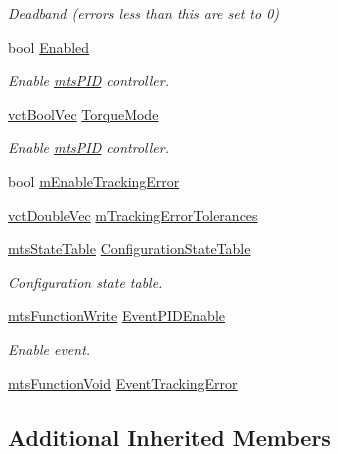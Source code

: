 \begin{DoxyCompactItemize}
\begin{DoxyCompactList}\small\item\em Deadband (errors less than this are set to 0) \end{DoxyCompactList}\item 
bool \hyperlink{classmts_p_i_d_afc7cfa0ce58391af303c8efc4430e427}{Enabled}
\begin{DoxyCompactList}\small\item\em Enable \hyperlink{classmts_p_i_d}{mts\+P\+I\+D} controller. \end{DoxyCompactList}\item 
\hyperlink{vct_dynamic_vector_types_8h_aeb2237c134aee3769198bd9d55c8a9e0}{vct\+Bool\+Vec} \hyperlink{classmts_p_i_d_a7bd7ccfcdc69d5d5b91087f019c01c63}{Torque\+Mode}
\begin{DoxyCompactList}\small\item\em Enable \hyperlink{classmts_p_i_d}{mts\+P\+I\+D} controller. \end{DoxyCompactList}\item 
bool \hyperlink{classmts_p_i_d_aa6fc2821554893e5dfe885094fde8017}{m\+Enable\+Tracking\+Error}
\item 
\hyperlink{vct_dynamic_vector_types_8h_ade4b3068c86fb88f41af2e5187e491c2}{vct\+Double\+Vec} \hyperlink{classmts_p_i_d_aad179eaa7eaf2157c2afb60a3d2c4f5d}{m\+Tracking\+Error\+Tolerances}
\item 
\hyperlink{classmts_state_table}{mts\+State\+Table} \hyperlink{classmts_p_i_d_a06df8f0f65fe6954383297ead5a689e8}{Configuration\+State\+Table}
\begin{DoxyCompactList}\small\item\em Configuration state table. \end{DoxyCompactList}\item 
\hyperlink{classmts_function_write}{mts\+Function\+Write} \hyperlink{classmts_p_i_d_a8fa9fc299b55b042978a0487780441d1}{Event\+P\+I\+D\+Enable}
\begin{DoxyCompactList}\small\item\em Enable event. \end{DoxyCompactList}\item 
\hyperlink{classmts_function_void}{mts\+Function\+Void} \hyperlink{classmts_p_i_d_abac293831162277a7c3934a1efbe97dc}{Event\+Tracking\+Error}
\end{DoxyCompactItemize}
\subsection*{Additional Inherited Members}


